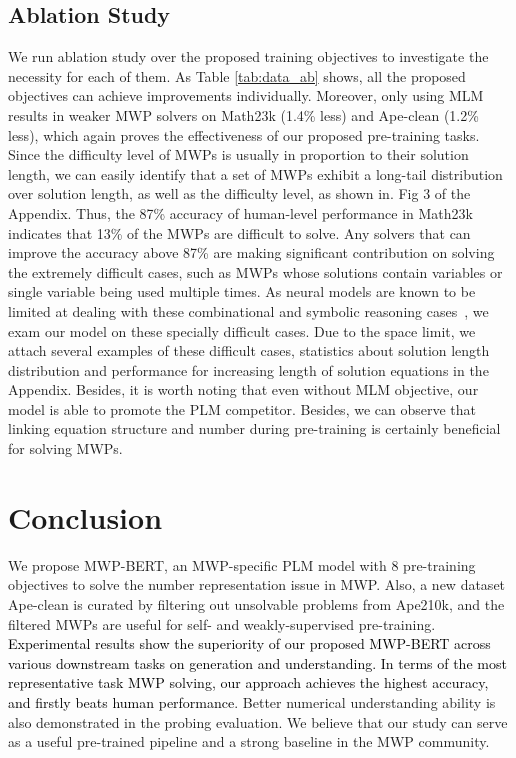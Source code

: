 \documentclass[11pt]{article}
\begin{document}
\subsection{Ablation Study} \label{experiment:ablation}
We run ablation study over the proposed training objectives to investigate the necessity for each of them. As Table \ref{tab:data_ab} shows, all the proposed objectives can achieve improvements individually. Moreover, only using MLM results in weaker MWP solvers on Math23k (1.4\% less) and Ape-clean (1.2\% less), which again proves the effectiveness of our proposed pre-training tasks. Since the difficulty level of MWPs is usually in proportion to their solution length, we can easily identify that a set of MWPs exhibit a long-tail distribution over solution length, as well as the  difficulty level, as shown in. Fig 3 of the Appendix. Thus,
the 87\% accuracy of human-level performance in Math23k ~\cite{wang2019template} indicates that 13\% of the MWPs are difficult to solve. Any solvers that can improve the accuracy above  87\% are making significant contribution on solving the extremely difficult cases, such as MWPs whose solutions contain  variables or single variable being used multiple times.
As neural models are known to be limited at dealing with these combinational and symbolic reasoning cases~\cite{DBLP:conf/iclr/LeeSRLB20}, we exam our model on these specially difficult cases.   Due to the space limit, we attach  several   examples of these difficult cases, statistics about solution length distribution and performance for increasing length of solution equations in the Appendix.  
Besides, it is worth noting that even without MLM objective, our model is able to promote the PLM competitor. Besides, we can observe that linking equation structure and number during pre-training is certainly beneficial for solving MWPs. 



 
\section{Conclusion}
We propose MWP-BERT, an MWP-specific PLM model with 8 pre-training objectives to solve the number representation issue in MWP. Also, a new dataset Ape-clean is curated by filtering out unsolvable problems from Ape210k, and the filtered MWPs are useful for self- and weakly-supervised pre-training. \textcolor{black}{Experimental results show the superiority of our proposed MWP-BERT across various downstream tasks on generation and understanding. In terms of the most representative task MWP solving, our approach achieves the highest accuracy, and firstly beats human performance}. Better numerical understanding ability is also demonstrated in the probing evaluation. We believe that our study can serve as a useful pre-trained pipeline and a strong baseline in the MWP community.
\end{document}
